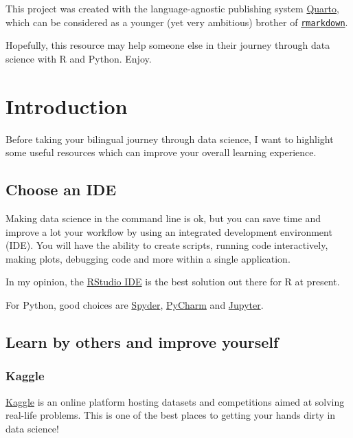 \documentclass[
  letterpaper,
  DIV=11,
  numbers=noendperiod]{scrreprt}
\begin{document}
This project was created with the language-agnostic publishing system
\href{https://quarto.org/}{Quarto}, which can be considered as a younger
(yet very ambitious) brother of
\href{https://rmarkdown.rstudio.com/}{\texttt{rmarkdown}}.

Hopefully, this resource may help someone else in their journey through
data science with R and Python. Enjoy.

\hypertarget{introduction}{%
\chapter{Introduction}\label{introduction}}

Before taking your bilingual journey through data science, I want to
highlight some useful resources which can improve your overall learning
experience.

\hypertarget{choose-an-ide}{%
\section{Choose an IDE}\label{choose-an-ide}}

Making data science in the command line is ok, but you can save time and
improve a lot your workflow by using an integrated development
environment (IDE). You will have the ability to create scripts, running
code interactively, making plots, debugging code and more within a
single application.

In my opinion, the
\href{https://www.rstudio.com/products/rstudio/}{RStudio IDE} is the
best solution out there for R at present.

For Python, good choices are \href{https://www.spyder-ide.org/}{Spyder},
\href{https://www.jetbrains.com/pycharm/}{PyCharm} and
\href{https://jupyter.org/}{Jupyter}.

\hypertarget{learn-by-others-and-improve-yourself}{%
\section{Learn by others and improve
yourself}\label{learn-by-others-and-improve-yourself}}

\hypertarget{kaggle}{%
\subsection{Kaggle}\label{kaggle}}

\href{https://www.kaggle.com/}{Kaggle} is an online platform hosting
datasets and competitions aimed at solving real-life problems. This is
one of the best places to getting your hands dirty in data science!
\end{document}
